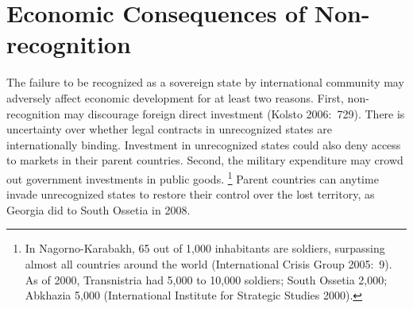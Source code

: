 \documentclass[12pt,a4paper]{article}%
\begin{document}
 
 

\section{Economic Consequences of Non-recognition}\label{theory}
The failure to be recognized as a sovereign state by international community may adversely affect economic development for at least two reasons.
First, non-recognition may discourage foreign direct investment (Kolsto 2006:\ 729). 
There is uncertainty over whether legal contracts in unrecognized states are internationally binding. 
Investment in unrecognized states could also deny access to markets in their parent countries.
Second, the military expenditure may crowd out government investments in public goods.%
\footnote{
	In Nagorno-Karabakh, 65 out of 1,000 inhabitants are soldiers, surpassing almost all countries around the world (International Crisis Group 2005:\ 9). 
	As of 2000, Transnistria had 5,000 to 10,000 soldiers; South Ossetia 2,000; Abkhazia 5,000 (International Institute for Strategic Studies 2000).
}
Parent countries can anytime invade unrecognized states to restore their control over the lost territory, as Georgia did to South Ossetia in 2008.
\end{document}
